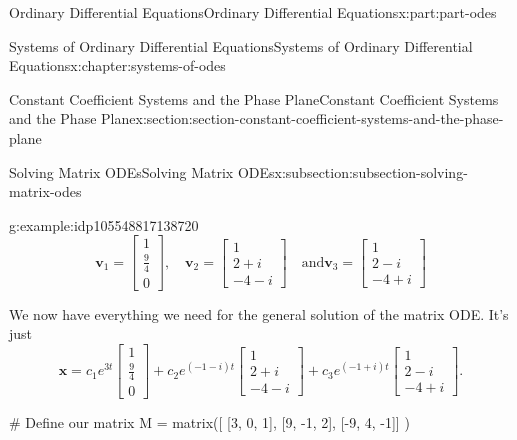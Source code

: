 \documentclass[twoside,10pt,]{book}
\numberwithin{equation}{part}
\renewcommand{\vec}[1]{\mathbf{#1}}
\begin{document}
\begin{partptx}{Ordinary Differential Equations}{}{Ordinary Differential Equations}{}{}{x:part:part-odes}
\begin{chapterptx}{Systems of Ordinary Differential Equations}{}{Systems of Ordinary Differential Equations}{}{}{x:chapter:systems-of-odes}
\begin{sectionptx}{Constant Coefficient Systems and the Phase Plane}{}{Constant Coefficient Systems and the Phase Plane}{}{}{x:section:section-constant-coefficient-systems-and-the-phase-plane}
\begin{subsectionptx}{Solving Matrix ODEs}{}{Solving Matrix ODEs}{}{}{x:subsection:subsection-solving-matrix-odes}
\begin{example}{}{g:example:idp105548817138720}
\begin{equation*}
\vec{v}_{1} = \begin{bmatrix}1 \\ \frac{9}{4} \\ 0\end{bmatrix}, \quad\vec{v}_{2} = \begin{bmatrix} 1 \\ 2 + i \\ -4 - i \end{bmatrix}\quad\text{and}\vec{v}_{3} = \begin{bmatrix} 1 \\ 2 - i \\ -4 + i \end{bmatrix}
\end{equation*}
%
\par
We now have everything we need for the general solution of the matrix ODE. It's just%
\begin{equation*}
\vec{x} = c_{1}e^{3t}\begin{bmatrix}1 \\ \frac{9}{4} \\ 0\end{bmatrix} + c_{2}e^{(-1 - i)t}\begin{bmatrix} 1 \\ 2 + i \\ -4 - i \end{bmatrix} + c_{3}e^{(-1 + i)t}\begin{bmatrix} 1 \\ 2 - i \\ -4 + i \end{bmatrix}.
\end{equation*}
%
\end{example}
\begin{sageinput}
# Define our matrix
M = matrix([ [3, 0, 1],
[9, -1, 2],
[-9, 4, -1]] )


\end{sageinput}
\end{subsectionptx}
\end{sectionptx}
\end{chapterptx}
\end{partptx}
\end{document}
